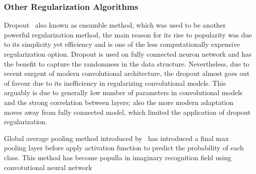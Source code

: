 \subsubsection{Other Regularization Algorithms}

Dropout~\cite{JMLR:v15:srivastava14a} also known as ensumble method, which was used to be another powerful regularization method, the main reason for its rise to popularity was due to its simplicity yet efficiency and is one of the less computationally expensive regularization option. Dropout is used on fully connected neuron network and has the benefit to capture the randomness in the data structure. Nevertheless, due to recent surgent of modern convolutional architecture, the dropout almost goes out of favour due to its inefficiency in regularizing convolutional models. This arguably is due to generally low number of parameters in convolutional models and the strong correlation between layers; also the more modern adaptation moves away from fully connected model, which limited the application of dropout regularization. 
\par 
Global average pooling method introduced by~\citet{LinCY13} has introduced a final max pooling layer before apply activation function to predict the probability of each class. This method has become populla in imaginary recognition field using convotutional neural network